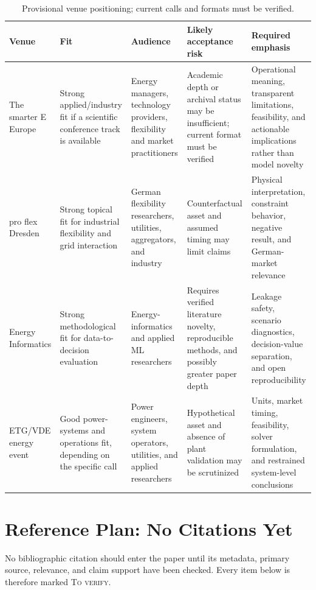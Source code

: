 \documentclass[10pt,twocolumn]{article}
\newcommand{\tverify}{\textsc{To verify}}
\begin{document}
\begin{table}[h]
\centering
\caption{Provisional venue positioning; current calls and formats must be verified.}
\small
\begin{tabularx}{\textwidth}{p{}p{}p{}p{}X}
\toprule
Venue & Fit & Audience & Likely acceptance risk & Required emphasis\\
\midrule
The smarter E Europe & Strong applied/industry fit if a scientific conference track is available & Energy managers, technology providers, flexibility and market practitioners & Academic depth or archival status may be insufficient; current format must be verified & Operational meaning, transparent limitations, feasibility, and actionable implications rather than model novelty\\
pro flex Dresden & Strong topical fit for industrial flexibility and grid interaction & German flexibility researchers, utilities, aggregators, and industry & Counterfactual asset and assumed timing may limit claims & Physical interpretation, constraint behavior, negative result, and German-market relevance\\
Energy Informatics & Strong methodological fit for data-to-decision evaluation & Energy-informatics and applied ML researchers & Requires verified literature novelty, reproducible methods, and possibly greater paper depth & Leakage safety, scenario diagnostics, decision-value separation, and open reproducibility\\
ETG/VDE energy event & Good power-systems and operations fit, depending on the specific call & Power engineers, system operators, utilities, and applied researchers & Hypothetical asset and absence of plant validation may be scrutinized & Units, market timing, feasibility, solver formulation, and restrained system-level conclusions\\
\bottomrule
\end{tabularx}
\end{table}

\section{Reference Plan: No Citations Yet}
\label{app:references}

No bibliographic citation should enter the paper until its metadata, primary
source, relevance, and claim support have been checked. Every item below is
therefore marked \tverify{}.
\end{document}
